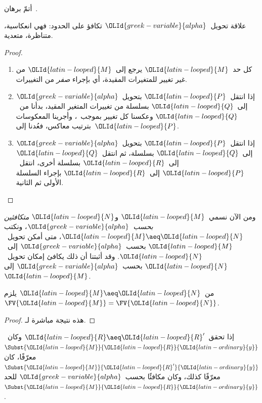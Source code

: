 \documentclass[../../../include/open-logic-section]{subfiles}
\begin{document}
\begin{prob}
  أتمّ برهان~.
\end{prob}

\begin{thm}
  علاقة تحويل~$\OLId{greek-variable}{alpha}$ تكافؤ على الحدود: فهي انعكاسية، متناظرة، متعدية.
\end{thm}

\begin{proof}
  \begin{enumerate}
  \item كل حد~$\OLId{latin-looped}{M}$ يرجع إلى~$\OLId{latin-looped}{M}$ من غير تغيير للمتغيرات المقيدة،
    أي بإجراء \emph{صفر} من التغييرات.
  \item إذا انتقل~$\OLId{latin-looped}{P}$ بتحويل~$\OLId{greek-variable}{alpha}$ إلى~$\OLId{latin-looped}{Q}$ بسلسلة من تغييرات المتغير المقيد،
    بدأنا من~$\OLId{latin-looped}{Q}$ وعكسنا كل تغيير بموجب~،
    وأجرينا المعكوسات بترتيب معاكس، فعُدنا إلى~$\OLId{latin-looped}{P}$.
  \item إذا انتقل~$\OLId{latin-looped}{P}$ بتحويل~$\OLId{greek-variable}{alpha}$ إلى~$\OLId{latin-looped}{Q}$ بسلسلة،
    ثم انتقل~$\OLId{latin-looped}{Q}$ إلى~$\OLId{latin-looped}{R}$ بسلسلة أخرى،
    انتقل~$\OLId{latin-looped}{P}$ إلى~$\OLId{latin-looped}{R}$ بإجراء السلسلة الأولى ثم الثانية.
  \end{enumerate}
\end{proof}

ومن الآن نسمي~$\OLId{latin-looped}{M}$ و$\OLId{latin-looped}{N}$ \emph{متكافئين بحسب~$\OLId{greek-variable}{alpha}$}، ونكتب
$\OLId{latin-looped}{M} \aeq \OLId{latin-looped}{N}$، متى أمكن تحويل~$\OLId{latin-looped}{M}$ بحسب~$\OLId{greek-variable}{alpha}$ إلى~$\OLId{latin-looped}{N}$.
وقد أثبتنا أن ذلك يكافئ إمكان تحويل~$\OLId{latin-looped}{N}$ بحسب~$\OLId{greek-variable}{alpha}$ إلى~$\OLId{latin-looped}{M}$.

\begin{thm}
  من~$\OLId{latin-looped}{M} \aeq \OLId{latin-looped}{N}$ يلزم~$\FV{\OLId{latin-looped}{M}} = \FV{\OLId{latin-looped}{N}}$.
\end{thm}

\begin{proof}
  هذه نتيجة مباشرة لـ.
\end{proof}

\begin{lem}
  إذا تحقق~$\OLId{latin-looped}{R} \aeq \OLId{latin-looped}{R}'$ وكان~$\Subst{\OLId{latin-looped}{M}}{\OLId{latin-looped}{R}}{\OLId{latin-ordinary}{y}}$ معرّفًا، كان
  $\Subst{\OLId{latin-looped}{M}}{\OLId{latin-looped}{R}'}{\OLId{latin-ordinary}{y}}$ معرّفًا كذلك، وكان مكافئًا بحسب~$\OLId{greek-variable}{alpha}$ للحد~$\Subst{\OLId{latin-looped}{M}}{\OLId{latin-looped}{R}}{\OLId{latin-ordinary}{y}}$.
\end{lem}
\end{document}
